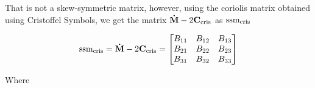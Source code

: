 That is not a skew-symmetric matrix, however, using the coriolis matrix obtained using Cristoffel Symbols, we get the matrix $\mathbf{\dot{M}} - 2\mathbf{C}_{\textup{cris}}$ as $\textup{ssm}_{\textup{cris}}$

\begin{equation}
    \textup{ssm}_{\textup{cris}} = \mathbf{\dot{M}} - 2\mathbf{C}_{\textup{cris}} = \begin{bmatrix}
        B_{11} & B_{12} & B_{13} \\
        B_{21} & B_{22} & B_{23} \\
        B_{31} & B_{32} & B_{33}
    \end{bmatrix}
    \label{eq:app-3r-dyn-ssm-cris-mat}
\end{equation}

Where

